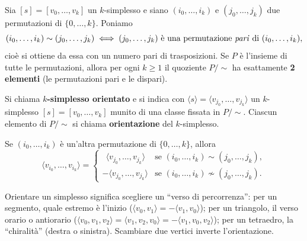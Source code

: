 Sia $[s] = [v_0, \dots, v_k]$ un $k$-simplesso e siano $(i_0, \dots, i_k)$ e $(j_0, \dots, j_k)$ due permutazioni di $\{0, \dots, k\}$. Poniamo
\[
(i_0, \dots, i_k) \sim (j_0, \dots, j_k) \iff (j_0, \dots, j_k) \text{ \`e una permutazione \emph{pari} di } (i_0, \dots, i_k),
\]
cio\`e si ottiene da essa con un numero pari di trasposizioni. Se $P$ \`e l'insieme di tutte le permutazioni, allora per ogni $k \geqslant 1$ il quoziente $P/\!\sim$ ha esattamente \textbf{2 elementi} (le permutazioni pari e le dispari).

\begin{definicion}
Si chiama \textbf{$k$-simplesso orientato} e si indica con $\langle s \rangle = \langle v_{j_0}, \dots, v_{j_k} \rangle$ un $k$-simplesso $[s] = [v_0, \dots, v_k]$ munito di una classe fissata in $P/\!\sim$. Ciascun elemento di $P/\!\sim$ si chiama \textbf{orientazione} del $k$-simplesso.
\end{definicion}

Se $(i_0, \dots, i_k)$ \`e un'altra permutazione di $\{0, \dots, k\}$, allora
\[
\langle v_{i_0}, \dots, v_{i_k} \rangle = \begin{cases} \ \ \langle v_{j_0}, \dots, v_{j_k} \rangle & \text{se } (i_0, \dots, i_k) \sim (j_0, \dots, j_k), \\ -\langle v_{j_0}, \dots, v_{j_k} \rangle & \text{se } (i_0, \dots, i_k) \not\sim (j_0, \dots, j_k). \end{cases}
\]

\begin{intuizione}
Orientare un simplesso significa scegliere un ``verso di percorrenza'': per un segmento, quale estremo \`e l'inizio ($\langle v_0, v_1 \rangle = - \langle v_1, v_0 \rangle$); per un triangolo, il verso orario o antiorario ($\langle v_0, v_1, v_2 \rangle = \langle v_1, v_2, v_0 \rangle = - \langle v_1, v_0, v_2 \rangle$); per un tetraedro, la ``chiralit\`a'' (destra o sinistra). Scambiare due vertici inverte l'orientazione.
\end{intuizione}

